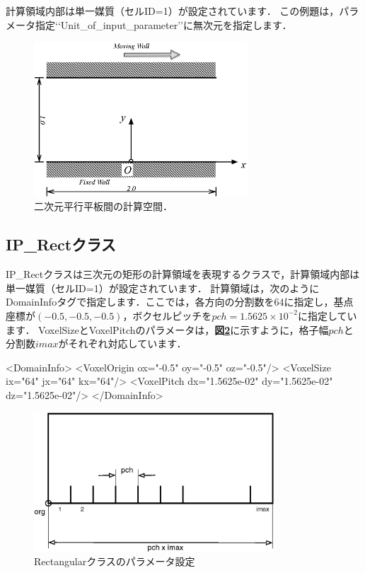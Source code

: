 計算領域内部は単一媒質（セルID=1）が設定されています．
この例題は，パラメータ指定\lq\lq Unit\_of\_input\_parameter\rq\rq に無次元を指定します．

\begin{figure}[htdp]
\begin{center}
\includegraphics[width=8cm,clip]{PPLT2D.eps}
\end{center}
\caption{二次元平行平板間の計算空間．}
\label{fig:pplate2d}
\end{figure}


%
\subsection{IP\_Rectクラス}
IP\_Rectクラスは三次元の矩形の計算領域を表現するクラスで，計算領域内部は単一媒質（セルID=1）が設定されています．
計算領域は，次のようにDomainInfoタグで指定します．ここでは，各方向の分割数を64に指定し，基点座標が$(-0.5, -0.5, -0.5)$，ボクセルピッチを$pch=1.5625\times10^{-2}$に指定しています．
VoxelSizeとVoxelPitchのパラメータは，\textbf{図\ref{fig:rect intrinsic class}}に示すように，格子幅$pch$と分割数$imax$がそれぞれ対応しています．


{\small
\begin{program}
<DomainInfo>
  <VoxelOrigin ox="-0.5" oy="-0.5" oz="-0.5"/>
  <VoxelSize ix="64" jx="64" kx="64"/>
  <VoxelPitch dx="1.5625e-02" dy="1.5625e-02" dz="1.5625e-02"/>
</DomainInfo>
\end{program}
}


\begin{figure}[htdp]
\begin{center}
\includegraphics[width=9cm,clip]{rect.eps}
\caption{Rectangularクラスのパラメータ設定}
\label{fig:rect intrinsic class}
\end{center}
\end{figure}



